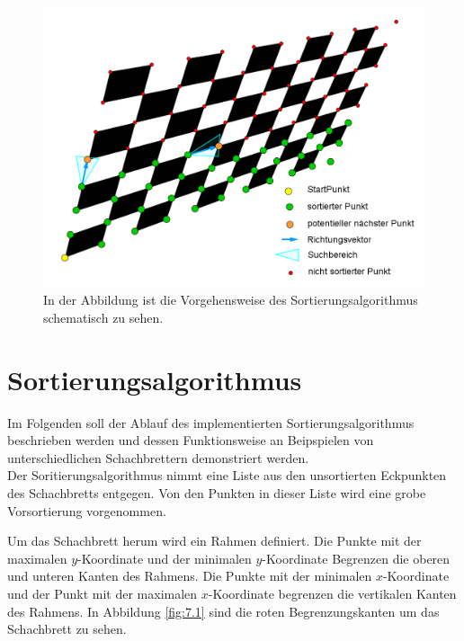 \begin{figure}[!htb]
	\centering
	\includegraphics[width=0.8\linewidth]{images/VerzeichnetesSchachbretFunktion.png}
	\caption[Funktionsübersicht des Sorieralgorithmus]{In der Abbildung ist die Vorgehensweise des Sortierungsalgorithmus schematisch zu sehen.}
	\label{fig:UebersichtSortierungsAlg}
\end{figure}




\section{Sortierungsalgorithmus}

Im Folgenden soll der Ablauf des implementierten Sortierungsalgorithmus beschrieben werden und dessen Funktionsweise an Beipspielen von unterschiedlichen Schachbrettern demonstriert werden.\\

Der Soritierungsalgorithmus nimmt eine Liste aus den unsortierten Eckpunkten des Schachbretts entgegen. Von den Punkten in dieser Liste wird eine grobe Vorsortierung vorgenommen.

Um das Schachbrett herum wird ein Rahmen definiert. Die Punkte mit der maximalen $y$-Koordinate und der minimalen $y$-Koordinate Begrenzen die oberen und unteren Kanten des Rahmens. Die Punkte mit der minimalen $x$-Koordinate und der Punkt mit der  maximalen $x$-Koordinate begrenzen die vertikalen Kanten des Rahmens. In Abbildung \ref{fig:7.1} sind die roten Begrenzungskanten um das Schachbrett zu sehen.\\

